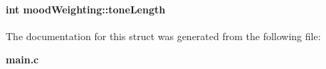\paragraph[{tone\+Length}]{\setlength{\rightskip}{0pt plus 5cm}int mood\+Weighting\+::tone\+Length}\label{structmood_weighting_ab9e917ae02761f06d11c59645a45536d}


The documentation for this struct was generated from the following file\+:\begin{DoxyCompactItemize}
\item 
{\bf main.\+c}\end{DoxyCompactItemize}
